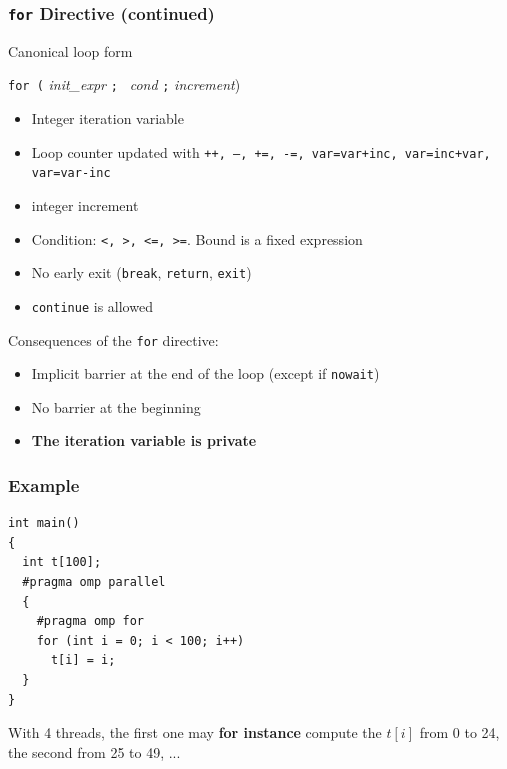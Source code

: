 \documentclass{beamer}
\begin{document}
\begin{frame}
  \frametitle{\texttt{for} Directive (continued)}

  \begin{block}{Canonical loop form}
  
 \centerline{ {\tt for (} {\it init\_expr} {\tt ; } {\it cond} {\tt ;} {\it increment})}
 
\begin{itemize}
\item Integer iteration variable

\item Loop counter updated with \texttt{++, --, +=, -=, var=var+inc,
    var=inc+var, var=var-inc}
\item integer increment

\item Condition: \texttt{<, >, <=, >=}. Bound is a fixed expression

\item No early exit ({\tt break}, {\tt return}, {\tt exit})
\item \texttt{continue} is allowed
\end{itemize}
\end{block}

\medskip

Consequences of the \texttt{for} directive:
\begin{itemize}
\item Implicit barrier at the end of the loop (except if {\tt nowait})
\item No barrier at the beginning
\item \textbf{The iteration variable is private}
\end{itemize}

\end{frame}


\begin{frame}[fragile=singleslide]
  \frametitle{Example}
\begin{verbatim}
int main()
{
  int t[100];
  #pragma omp parallel 
  {
    #pragma omp for  
    for (int i = 0; i < 100; i++)
      t[i] = i;
  }
}
\end{verbatim}

  With 4 threads, the first one may {\bf for instance} compute the $t[i]$ from 0 to 24,
  the second from 25 to 49, ...
\end{frame}
\end{document}
